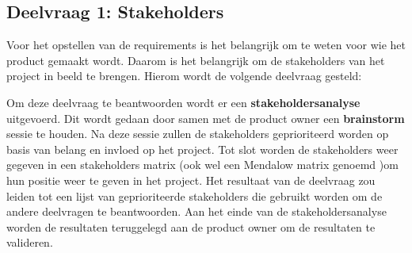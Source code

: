 \subsection{Deelvraag 1: Stakeholders}
Voor het opstellen van de requirements is het belangrijk om te weten voor wie het product gemaakt wordt.
Daarom is het belangrijk om de stakeholders van het project in beeld te brengen.
Hierom wordt de volgende deelvraag gesteld:

\begin{center}
	\textit{\SubquestionOne}
\end{center}

\whitespace[0.2]
Om deze deelvraag te beantwoorden wordt er een \textbf{stakeholdersanalyse} uitgevoerd.
Dit wordt gedaan door samen met de product owner een \textbf{brainstorm} sessie te houden.
Na deze sessie zullen de stakeholders geprioriteerd worden op basis van belang en invloed op het project.
Tot slot worden de stakeholders weer gegeven in een stakeholders matrix (ook wel een Mendalow matrix genoemd \Parencite{MandelowMatrix})om hun positie weer te geven in het project.
Het resultaat van de deelvraag zou leiden tot een lijst van geprioriteerde stakeholders die gebruikt worden om de andere deelvragen te beantwoorden.
Aan het einde van de stakeholdersanalyse worden de resultaten teruggelegd aan de product owner om de resultaten te valideren.

